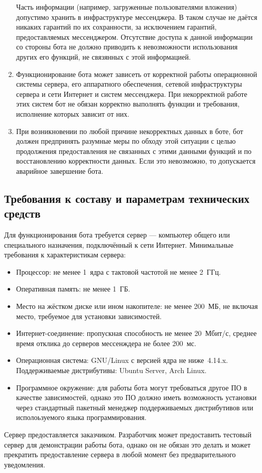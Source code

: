 \begin{enumerate}
            Часть информации (например, загруженные пользователями вложения) допустимо хранить в
            инфраструктуре мессенджера. В таком случае не даётся никаких гарантий по их сохранности,
            за исключением гарантий, предоставляемых мессенджером. Отсутствие доступа
            к данной информации со стороны бота не должно приводить к невозможности использования
            других его функций, не связянных с этой информацией.
        \item
            Функционирование бота может зависеть от корректной работы операционной системы сервера,
            его аппаратного обеспечения, сетевой инфраструктуры сервера и сети Интернет и систем мессенджера.
            При некорректной работе этих систем бот не обязан корректно выполнять функции и требования,
            исполнение которых зависит от них.
        \item
            При возникновении по любой причине некорректных данных в боте, бот должен предпринять
            разумные меры по обходу этой ситуации с целью продолжения предоставления не связанных
            с этими данными функций и по восстановлению корректности данных. Если это невозможно,
            то допускается аварийное завершение бота.
    \end{enumerate}

\subsection{Требования к составу и параметрам технических средств}
    \label{sec:req:hw}
    Для функционирования бота требуется сервер --- компьютер общего или специального назначения,
    подключённый к сети Интернет. Минимальные требования к характеристикам сервера:
    \begin{itemize}
        \item
            Процессор: не менее 1~ядра с тактовой частотой не менее 2~ГГц.
        \item
            Оперативная память: не менее 1~ГБ.
        \item
            Место на жёстком диске или ином накопителе: не менее 200~МБ, не включая место, требуемое
            для установки зависимостей.
        \item
            Интернет-соединение: пропускная способность не менее 20~Мбит/с, среднее время отклика
            до серверов мессенждера не более 200~мс.
        \item
            Операционная система: GNU/Linux с версией ядра не ниже~4.14.x.
            Поддерживаемые дистрибутивы: Ubuntu Server, Arch Linux.
        \item
            Программное окружение: для работы бота могут требоваться другое ПО в качестве зависимостей,
            однако это ПО должно иметь возможность установки через стандартный пакетный менеджер
            поддерживаемых дистрибутивов или исполоьзуемого языка программирования.
    \end{itemize}
    Сервер предоставляется заказчиком. Разработчик может предоставить тестовый сервер для демонстрации
    работы бота, однако он не обязан это делать и может прекратить предоставление сервера в любой момент
    без предварительного уведомления.

